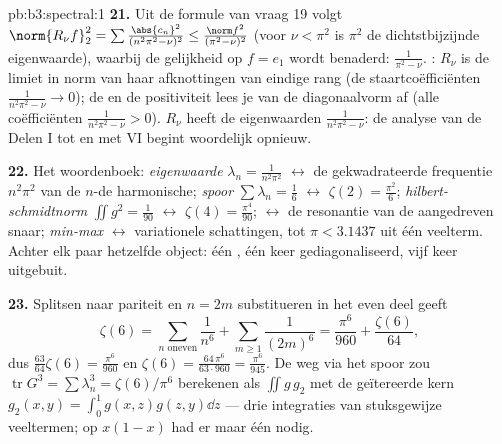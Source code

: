 \begin{solution}{pb:b3:spectral:1}
\textbf{21.} Uit de formule van vraag 19 volgt $\norm{R_\nu
f}_2^2 = \sum\frac{\abs{c_n}^2}{(n^2\pi^2 - \nu)^2} \leq
\frac{\norm f^2}{(\pi^2 - \nu)^2}$ (voor $\nu < \pi^2$ is $\pi^2$
de dichtstbijzijnde eigenwaarde), waarbij de gelijkheid op $f =
e_1$ wordt benaderd:  $\frac1{\pi^2 - \nu}$.
: $R_\nu$ is de limiet in norm van haar afknottingen
van eindige rang (de staartcoëfficiënten $\frac1{n^2\pi^2 - \nu}
\to 0$); de  en de positiviteit lees je van de
diagonaalvorm af (alle coëfficiënten $\frac1{n^2\pi^2 - \nu} >
0$). $R_\nu$ heeft de eigenwaarden $\frac1{n^2\pi^2 - \nu}$: de
analyse van de Delen I tot en met VI begint woordelijk opnieuw.

\textbf{22.} Het woordenboek: \emph{eigenwaarde} $\lambda_n =
\frac1{n^2\pi^2}$ $\leftrightarrow$ de gekwadrateerde frequentie
$n^2\pi^2$ van de $n$-de harmonische; \emph{spoor} $\sum
\lambda_n = \frac16$ $\leftrightarrow$ $\zeta(2) =
\frac{\pi^2}6$; \emph{hilbert-schmidtnorm} $\iint g^2 =
\frac1{90}$ $\leftrightarrow$ $\zeta(4) = \frac{\pi^4}{90}$;
\emph{} $\leftrightarrow$ de resonantie
van de aangedreven snaar; \emph{min-max} $\leftrightarrow$
variationele schattingen, tot $\pi < 3.1437$ uit één veelterm.
Achter elk paar hetzelfde object: één  , één keer gediagonaliseerd, vijf keer uitgebuit.

\textbf{23.} Splitsen naar pariteit en $n = 2m$ substitueren in
het even deel geeft
\[
\zeta(6) = \sum_{n\text{ oneven}}\frac1{n^6} +
\sum_{m\geq1}\frac1{(2m)^6}
= \frac{\pi^6}{960} + \frac{\zeta(6)}{64},
\]
dus $\frac{63}{64}\zeta(6) = \frac{\pi^6}{960}$ en $\zeta(6) =
\frac{64\,\pi^6}{63\cdot960} = \frac{\pi^6}{945}$. De weg via het
spoor zou $\operatorname{tr}G^3 = \sum\lambda_n^3 =
\zeta(6)/\pi^6$ berekenen als $\iint g\,g_2$ met de geïtereerde
kern $g_2(x,y) = \int_0^1g(x,z)g(z,y)\dd z$ --- drie integraties
van stuksgewijze veeltermen;  op $x(1-x)$ had er maar één
nodig.


\end{solution}
